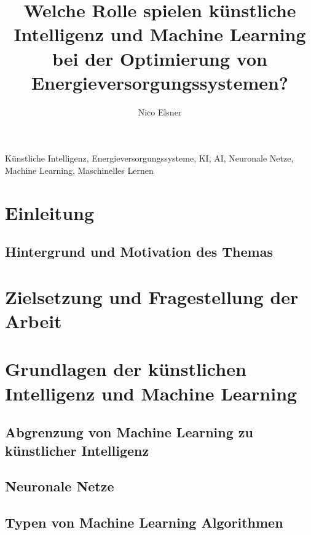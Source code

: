 \documentclass[conference]{IEEEtran}
\title{Welche Rolle spielen künstliche Intelligenz und Machine Learning bei der Optimierung von Energieversorgungssystemen?}
\author{
	\IEEEauthorblockN{Nico Elsner}
	\IEEEauthorblockA{
		\textit{Technische Hochschule Ingolstadt} \\
		16. Juni 2023 %
	}
}
\begin{document}

\maketitle
\author{{\Large Nico Elsner}}

\begin{abstract}
	
\end{abstract}

\begin{IEEEkeywords}
	Künstliche Intelligenz, Energieversorgungssysteme, KI, AI, Neuronale Netze, Machine Learning, Maschinelles Lernen
\end{IEEEkeywords}

\section{Einleitung}
\subsection{Hintergrund und Motivation des Themas}

\section{Zielsetzung und Fragestellung der Arbeit}


\section{Grundlagen der künstlichen Intelligenz und Machine Learning}

\subsection{Abgrenzung von Machine Learning zu künstlicher Intelligenz}

\subsection{Neuronale Netze}

\subsection{Typen von Machine Learning Algorithmen}

\end{document}
